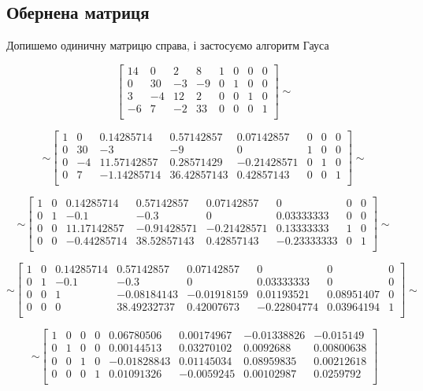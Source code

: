 \documentclass[a4paper, 12pt]{article}
\begin{document}
\newpage
\subsection*{Обернена матриця}

Допишемо одиничну матрицю справа, і застосуємо алгоритм Гауса

\[
\left[
\begin{array}{cccc|cccc}
14 & 0 & 2 & 8 & 1 & 0 & 0 & 0 \\
0 & 30 & -3 & -9 & 0 & 1 & 0 & 0 \\
3 & -4 & 12 & 2 & 0 & 0 & 1 & 0 \\
-6 & 7 & -2 & 33 & 0 & 0 & 0 & 1 \\
\end{array}
\right]
\sim
\]

\[
\sim
\left[
\begin{array}{cccc|cccc}
1 & 0 & 0.14285714 & 0.57142857 & 0.07142857 & 0 & 0 & 0 \\
0 & 30 & -3 & -9 & 0 & 1 & 0 & 0 \\
0 & -4 & 11.57142857 & 0.28571429 & -0.21428571 & 0 & 1 & 0 \\
0 & 7 & -1.14285714 & 36.42857143 & 0.42857143 & 0 & 0 & 1 \\
\end{array}
\right]
\sim
\]

\[
\sim
\left[
\begin{array}{cccc|cccc}
1 & 0 & 0.14285714 & 0.57142857 & 0.07142857 & 0 & 0 & 0 \\
0 & 1 & -0.1 & -0.3 & 0 & 0.03333333 & 0 & 0 \\
0 & 0 & 11.17142857 & -0.91428571 & -0.21428571 & 0.13333333 & 1 & 0 \\
0 & 0 & -0.44285714 & 38.52857143 & 0.42857143 & -0.23333333 & 0 & 1 \\
\end{array}
\right]
\sim
\]

\[
\sim
\left[
\begin{array}{cccc|cccc}
1 & 0 & 0.14285714 & 0.57142857 & 0.07142857 & 0 & 0 & 0 \\
0 & 1 & -0.1 & -0.3 & 0 & 0.03333333 & 0 & 0 \\
0 & 0 & 1 & -0.08184143 & -0.01918159 & 0.01193521 & 0.08951407 & 0 \\
0 & 0 & 0 & 38.49232737 & 0.42007673 & -0.22804774 & 0.03964194 & 1 \\
\end{array}
\right]
\sim
\]

\[
\sim
\left[
\begin{array}{cccc|cccc}
1 & 0 & 0 & 0 & 0.06780506 & 0.00174967 & -0.01338826 & -0.015149 \\
0 & 1 & 0 & 0 & 0.00144513 & 0.03270102 & 0.0092688 & 0.00800638 \\
0 & 0 & 1 & 0 & -0.01828843 & 0.01145034 & 0.08959835 & 0.00212618 \\
0 & 0 & 0 & 1 & 0.01091326 & -0.0059245 & 0.00102987 & 0.0259792 \\
\end{array}
\right]
\]
\end{document}
